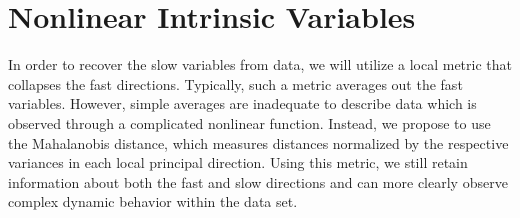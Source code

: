 \section{Nonlinear Intrinsic Variables}

In order to recover the slow variables from data, we will utilize a local metric that collapses the fast directions.
%
Typically, such a metric averages out the fast variables.
%
However, simple averages are inadequate to describe data which is observed through a complicated nonlinear function.
%
Instead, we propose to use the Mahalanobis distance, which measures distances normalized by the respective variances in each local principal direction.
%
Using this metric, we still retain information about both the fast and slow directions and can
more clearly observe complex dynamic behavior within the data set.

